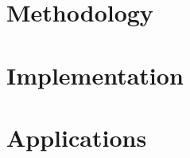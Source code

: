 \documentclass[a4paper]{layout/fenicsbooktest}
\begin{document}


%


\tableofcontents




%
%




\part{Methodology}


\part{Implementation}


\part{Applications}
\end{document}
